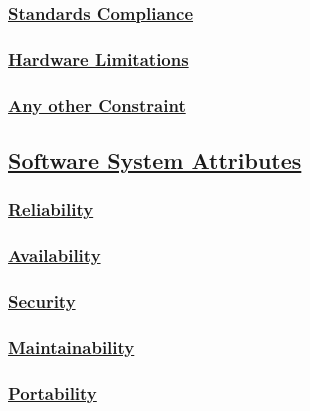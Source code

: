	\subsubsection[Standards Compliance]{\hyperlink{toc}{Standards Compliance}}
	\subsubsection[Hardware Limitations]{\hyperlink{toc}{Hardware Limitations}}
	\subsubsection[Any other Constraint]{\hyperlink{toc}{Any other Constraint}}

\subsection[Software System Attributes]{\hyperlink{toc}{Software System Attributes}}
	\subsubsection[Reliability]{\hyperlink{toc}{Reliability}}
	\subsubsection[Availability]{\hyperlink{toc}{Availability}}
	\subsubsection[Security]{\hyperlink{toc}{Security}}
	\subsubsection[Maintainability]{\hyperlink{toc}{Maintainability}}
	\subsubsection[Portability]{\hyperlink{toc}{Portability}}
